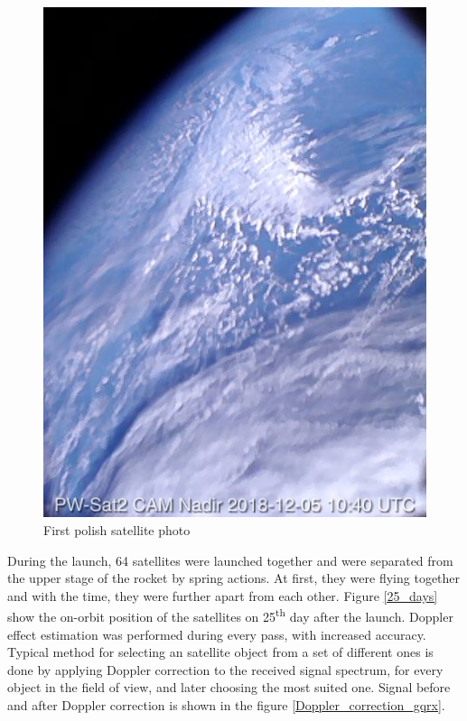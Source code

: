 \begin{figure}[H]
    \centering
    \includegraphics[width=0.65\paperwidth]{img/9/sat_photo.jpg}
    \caption{First polish satellite photo}
    \label{sat_photo}
\end{figure}

During the launch, \si{64} satellites were launched together and were separated from the upper stage of the rocket by spring actions. At first, they were flying together and with the time, they were further apart from each other. Figure \ref{25_days} show the on-orbit position of the satellites on \si{25^{th}} day after the launch. Doppler effect estimation was performed during every pass, with increased accuracy. Typical method for selecting an satellite object from a set of different ones is done by applying Doppler correction to the received signal spectrum, for every object in the field of view, and later choosing the most suited one. Signal before and after Doppler correction is shown in the figure \ref{Doppler_correction_gqrx}.

